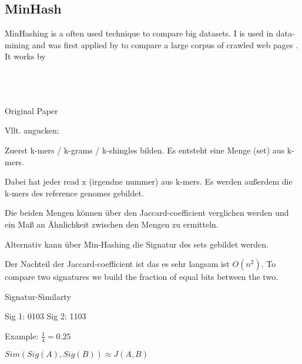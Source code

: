 
\subsection{MinHash}
\label{ssec:minhash}

MinHashing is a often used technique to compare big datasets. I is used in data-mining and was first applied by \cite{minhash} to compare a large corpus of crawled web pages \cite{minhash}. It works by 









\\
\\
\\




Original Paper \cite{minhash}

Vllt. angucken: \cite{shrivastava2014defense}



Zuerst k-mers / k-grams / k-shingles bilden.
Es entsteht eine Menge (set) aus k-mers.

Dabei hat jeder read x (irgendne nummer) aus k-mers.
Es werden außerdem die k-mers des reference genomes gebildet. 



Die beiden Mengen können über den Jaccard-coefficient verglichen werden und ein Maß an Ähnlichkeit zwischen den Mengen zu ermitteln.

Alternativ kann über Min-Hashing die Signatur des sets gebildet werden.

Der Nachteil der Jaccard-coefficient ist das es sehr langsam ist $ O(n^2) $.
To compare two signatures we build the fraction of equal bits between the two.


Signatur-Similarty

Sig 1: 0103
Sig 2: 1103

Example: $ \frac{1}{4} = 0.25 $

$ Sim(Sig(A), Sig(B)) \approx J(A, B) $